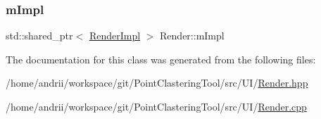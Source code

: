 \subsubsection{\texorpdfstring{m\+Impl}{mImpl}}
{\footnotesize\ttfamily std\+::shared\+\_\+ptr$<$ \mbox{\hyperlink{classRenderImpl}{Render\+Impl}} $>$ Render\+::m\+Impl\hspace{0.3cm}{\ttfamily [private]}}



The documentation for this class was generated from the following files\+:\begin{DoxyCompactItemize}
\item 
/home/andrii/workspace/git/\+Point\+Clastering\+Tool/src/\+U\+I/\mbox{\hyperlink{Render_8hpp}{Render.\+hpp}}\item 
/home/andrii/workspace/git/\+Point\+Clastering\+Tool/src/\+U\+I/\mbox{\hyperlink{Render_8cpp}{Render.\+cpp}}\end{DoxyCompactItemize}
